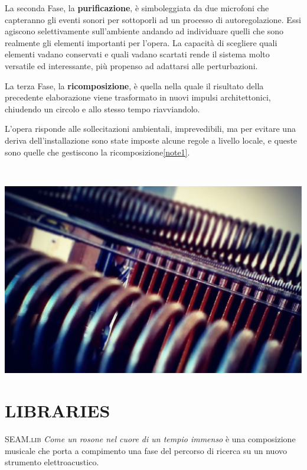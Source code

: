 \documentclass[
	a0,
	portrait
	]{a0poster}
\begin{document}
\begin{multicols}{4}
La seconda Fase, la \textbf{purificazione}, è simboleggiata da due microfoni che capteranno gli eventi sonori per sottoporli ad un processo di autoregolazione. Essi agiscono selettivamente sull’ambiente andando ad individuare quelli che sono realmente gli elementi importanti per l’opera. La capacità di scegliere quali elementi vadano conservati e quali vadano scartati rende il sistema molto versatile ed interessante, più propenso ad adattarsi alle perturbazioni.

La terza Fase, la \textbf{ricomposizione}, è quella nella quale il risultato della precedente elaborazione viene trasformato in nuovi impulsi architettonici, chiudendo un circolo e allo stesso tempo riavviandolo.

L’opera risponde alle sollecitazioni ambientali, imprevedibili, ma per evitare una deriva dell’installazione sono state imposte alcune regole a livello locale, e queste sono quelle che gestiscono la ricomposizione\cref{note1}.

\vfill

~

\columnbreak


\begin{center}
\includegraphics[width=1.\linewidth]{spire}
\end{center}

\section*{\color{cyellow}LIBRARIES}

\lettrine{SEAM}{.lib} \emph{Come un rosone nel cuore di un tempio immenso} è una composizione musicale che porta a compimento una fase del percorso di ricerca su un nuovo strumento elettroacustico.


\end{multicols}
\end{document}
